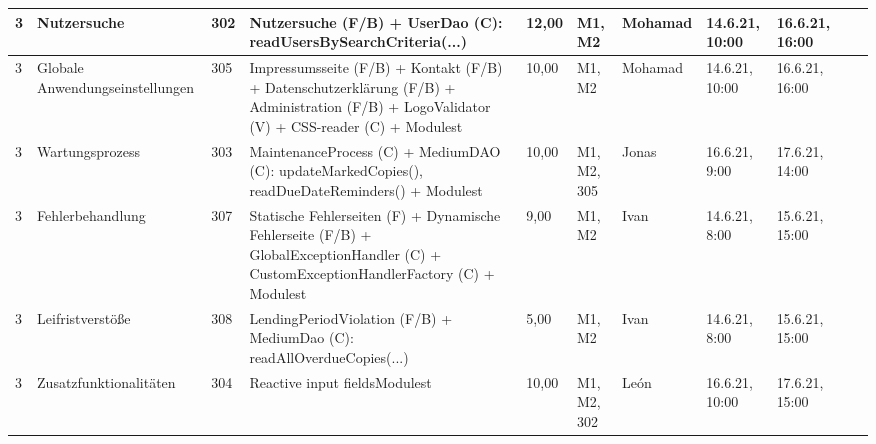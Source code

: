 \documentclass{article}
\begin{document}
\begin{table}[H]
\begin{tabular}{l l  l  l l  l  l l  l l  l}
3          & Nutzersuche                         & 302 & Nutzersuche (F/B) + UserDao (C): readUsersBySearchCriteria(...)                                                                                                                                                   & 12,00 & M1, M2             & Mohamad    & 14.6.21, 10:00 & 16.6.21, 16:00 &                         \\ \hline
3          & Globale Anwendungseinstellungen     & 305 & Impressumsseite (F/B) + Kontakt (F/B) + Datenschutzerklärung (F/B) + Administration (F/B) + LogoValidator (V) + CSS-reader (C) + Modulest                                                                                            & 10,00 & M1, M2             & Mohamad    & 14.6.21, 10:00 & 16.6.21, 16:00 &                         \\ \hline
3        & Wartungsprozess                     & 303 & MaintenanceProcess (C) + MediumDAO (C): updateMarkedCopies(), readDueDateReminders() + Modulest                                                                                                                     & 10,00 & M1, M2, 305        & Jonas      & 16.6.21, 9:00  & 17.6.21, 14:00 &                         \\ \hline
3          & Fehlerbehandlung                    & 307 & Statische Fehlerseiten (F) + Dynamische Fehlerseite (F/B) + GlobalExceptionHandler (C) + CustomExceptionHandlerFactory (C) + Modulest                                                                                      & 9,00  & M1, M2             & Ivan       & 14.6.21, 8:00  & 15.6.21, 15:00 &                         \\ \hline
3          & Leifristverstöße                    & 308 & LendingPeriodViolation (F/B) + MediumDao (C): readAllOverdueCopies(...)                                                                                                                                           & 5,00  & M1, M2             & Ivan       & 14.6.21, 8:00  & 15.6.21, 15:00 &                         \\ \hline
3          & Zusatzfunktionalitäten              & 304 & Reactive input fieldsModulest                                                                                                                                                                                  & 10,00 & M1, M2, 302        & León       & 16.6.21, 10:00 & 17.6.21, 15:00 &                       
\end{tabular}
\end{table}
\end{document}
